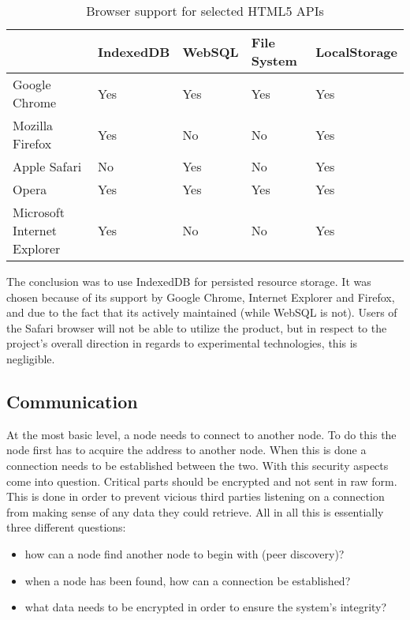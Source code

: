 \begin{table}
    \begin{tabular}{|l|l|l|l|l|}
    \hline
                       & IndexedDB & WebSQL & File System & LocalStorage \\ \hline
    Google Chrome               & Yes       & Yes    & Yes  & Yes                      \\ \hline
    Mozilla Firefox             & Yes       & \cellcolor{red}No  & \cellcolor{red}No   & Yes                        \\ \hline
    Apple Safari                & \cellcolor{red}No        & Yes  & \cellcolor{red}No    & Yes                        \\ \hline
    Opera                       & Yes       & Yes    & Yes  & Yes                      \\ \hline
    Microsoft Internet Explorer & Yes       & \cellcolor{red}No  & \cellcolor{red}No   & Yes                        \\ \hline
    \end{tabular}
    \caption {Browser support for selected HTML5 APIs}
\end{table}

The conclusion was to use IndexedDB for persisted resource storage. It was chosen because of its support by Google Chrome, Internet Explorer and Firefox, and due to the fact that its actively maintained (while WebSQL is not). Users of the Safari browser will not be able to utilize the product, but in respect to the project's overall direction in regards to experimental technologies, this is negligible.

\subsection{Communication}

At the most basic level, a node needs to connect to another node. To do this the node first has to acquire the address to another node. When this is done a connection needs to be established between the two. With this security aspects come into question. Critical parts should be encrypted and not sent in raw form. This is done in order to prevent vicious third parties listening on a connection from making sense of any data they could retrieve. All in all this is essentially three different questions:

\begin{itemize}
\item how can a node find another node to begin with (peer discovery)?
\item when a node has been found, how can a connection be established?
\item what data needs to be encrypted in order to ensure the system's integrity?
\end{itemize}

